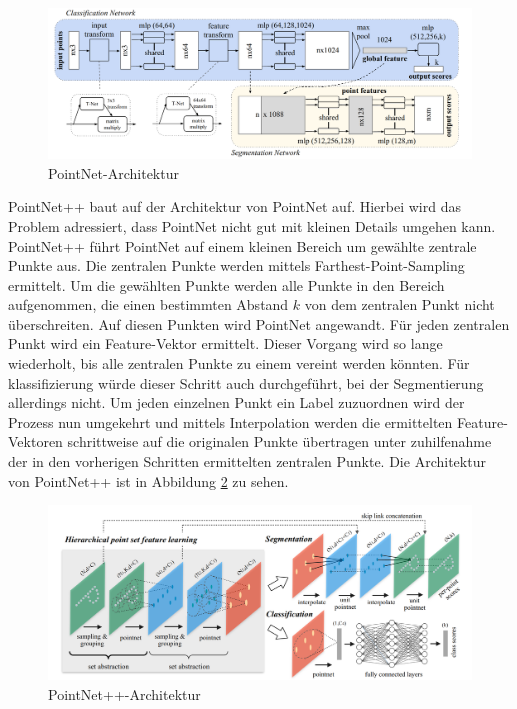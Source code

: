 \documentclass[12pt,titlepage, twoside]{article}
\begin{document}
\begin{figure}
    \centering
    \includegraphics[width=1.0\textwidth]{./Images/PointNetArchitektur.png}
    \caption{PointNet-Architektur \cite{qi2017pointnet}}
    \label{fig:point:net:arch}
\end{figure}

PointNet++ baut auf der Architektur von PointNet auf. Hierbei wird das Problem adressiert, dass PointNet nicht gut mit kleinen Details umgehen kann. 
PointNet++ führt PointNet auf einem kleinen Bereich um gewählte zentrale Punkte aus. Die zentralen Punkte werden mittels Farthest-Point-Sampling ermittelt. 
Um die gewählten Punkte werden alle Punkte in den Bereich aufgenommen, die einen bestimmten Abstand $k$ von dem zentralen Punkt nicht überschreiten. 
Auf diesen Punkten wird PointNet angewandt. Für jeden zentralen Punkt wird ein Feature-Vektor ermittelt.
Dieser Vorgang wird so lange wiederholt, bis alle zentralen Punkte zu einem vereint werden könnten. Für klassifizierung würde dieser Schritt auch durchgeführt, bei der Segmentierung allerdings nicht.
Um jeden einzelnen Punkt ein Label zuzuordnen wird der Prozess nun umgekehrt und mittels Interpolation werden die ermittelten Feature-Vektoren schrittweise auf die originalen Punkte übertragen 
unter zuhilfenahme der in den vorherigen Schritten ermittelten zentralen Punkte.
Die Architektur von PointNet++ ist in Abbildung \ref{fig:point:net:pp:arch} zu sehen.

\begin{figure}
    \centering
    \includegraphics[width=1.0\textwidth]{./Images/PointNetPPArchitektur.png}
    \caption{PointNet++-Architektur \cite{qi2017pointnet++}}
    \label{fig:point:net:pp:arch}
\end{figure}
\end{document}
